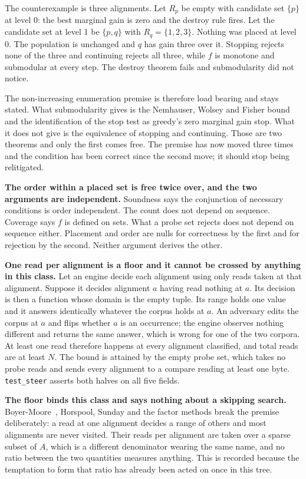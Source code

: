 The counterexample is three alignments. Let \(R_p\) be empty with candidate set \(\{p\}\) at level 0: the best marginal gain is zero and the destroy rule fires. Let the candidate set at level 1 be \(\{p, q\}\) with \(R_q = \{1,2,3\}\). Nothing was placed at level 0. The population is unchanged and \(q\) has gain three over it. Stopping rejects none of the three and continuing rejects all three, while \(f\) is monotone and submodular at every step. The destroy theorem fails and submodularity did not notice.

The non-increasing enumeration premise is therefore load bearing and stays stated. What submodularity gives is the Nemhauser, Wolsey and Fisher bound and the identification of the stop test as greedy's zero marginal gain stop. What it does not give is the equivalence of stopping and continuing. Those are two theorems and only the first comes free. The premise has now moved three times and the condition has been correct since the second move; it should stop being relitigated.

\textbf{The order within a placed set is free twice over, and the two arguments are independent.} Soundness says the conjunction of necessary conditions is order independent. The count does not depend on sequence. Coverage says \(f\) is defined on sets. What a probe set rejects does not depend on sequence either. Placement and order are nulls for correctness by the first and for rejection by the second. Neither argument derives the other.

\textbf{One read per alignment is a floor and it cannot be crossed by anything in this class.} Let an engine decide each alignment using only reads taken at that alignment. Suppose it decides alignment \(a\) having read nothing at \(a\). Its decision is then a function whose domain is the empty tuple. Its range holds one value and it answers identically whatever the corpus holds at \(a\). An adversary edits the corpus at \(a\) and flips whether \(a\) is an occurrence; the engine observes nothing different and returns the same answer, which is wrong for one of the two corpora. At least one read therefore happens at every alignment classified, and total reads are at least \(N\). The bound is attained by the empty probe set, which takes no probe reads and sends every alignment to a compare reading at least one byte. \texttt{test\_steer} asserts both halves on all five fields.

\textbf{The floor binds this class and says nothing about a skipping search.} Boyer-Moore~\cite{src:Boyer-and-Moore-1977}, Horspool, Sunday and the factor methods break the premise deliberately: a read at one alignment decides a range of others and most alignments are never visited. Their reads per alignment are taken over a sparse subset of \(A\), which is a different denominator wearing the same name, and no ratio between the two quantities measures anything. This is recorded because the temptation to form that ratio has already been acted on once in this tree.

